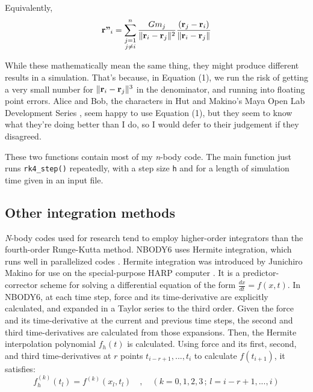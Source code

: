 \documentclass{article}
\DeclarePairedDelimiter{\norm}{\lVert}{\rVert}
\begin{document}
Equivalently,
\begin{equation}
    \textbf{r''}_i = \sum_{\substack{j=1\\j\neq i}}^n \frac{Gm_j}{\norm{\textbf{r}_i-\textbf{r}_j}^2}\frac{(\textbf{r}_j-\textbf{r}_i)}{\norm{\textbf{r}_i-\textbf{r}_j}}
\end{equation}

While these mathematically mean the same thing, they might produce different results in a simulation. That's because, in Equation (1), we run the risk of getting a very small number for $\norm{\textbf{r}_i-\textbf{r}_j}^3$ in the denominator, and running into floating point errors. Alice and Bob, the characters in Hut and Makino's Maya Open Lab Development Series \cite{hut2007art}, seem happy to use Equation (1), but they seem to know what they're doing better than I do, so I would defer to their judgement if they disagreed.

These two functions contain most of my \textit{n}-body code. The main function just runs \colorbox{g}{\lstinline[basicstyle=\ttfamily\footnotesize\color{black}]|rk4_step()|} repeatedly, with a step size \colorbox{g}{\lstinline[basicstyle=\ttfamily\footnotesize\color{black}]|h|} and for a length of simulation time given in an input file.

\subsection{Other integration methods}

\textit{N}-body codes used for research tend to employ higher-order integrators than the fourth-order Runge-Kutta method. NBODY6 uses Hermite integration, which runs well in parallelized codes \cite{aarseth1999nbody1}. Hermite integration was introduced by Junichiro Makino for use on the special-purpose HARP computer \cite{makino1991optimal}. It is a predictor-corrector scheme for solving a differential equation of the form $\frac{dx}{dt}=f(x,t)$. In NBODY6, at each time step, force and its time-derivative are explicitly calculated, and expanded in a Taylor series to the third order. Given the force and its time-derivative at the current and previous time steps, the second and third time-derivatives are calculated from those expansions. Then, the Hermite interpolation polynomial $f_h(t)$ is calculated. Using force and its first, second, and third time-derivatives at $r$ points $t_{i-r+1},...,t_i$ to calculate $f(t_{i+1})$, it satisfies:
\begin{equation}
f^{(k)}_h(t_l) = f^{(k)}(x_l,t_l) \quad,\quad (k=0,1,2,3\,;\,l=i-r+1,...,i)
\end{equation}
\end{document}
